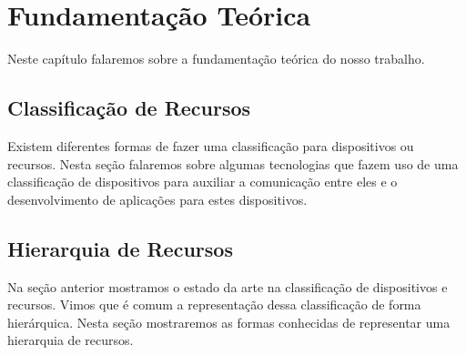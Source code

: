 \chapter{Fundamentação Teórica}

Neste capítulo falaremos sobre a fundamentação teórica do nosso trabalho.

\section{Classificação de Recursos}
Existem diferentes formas de fazer uma classificação para dispositivos ou recursos.
Nesta seção falaremos sobre algumas tecnologias que fazem uso de uma classificação de dispositivos para auxiliar a comunicação entre eles e o desenvolvimento de aplicações para estes dispositivos.






\section{Hierarquia de Recursos}
Na seção anterior mostramos o estado da arte na classificação de dispositivos e recursos. Vimos que é comum a representação dessa classificação de forma hierárquica. Nesta seção mostraremos as formas conhecidas de representar uma hierarquia de recursos.



